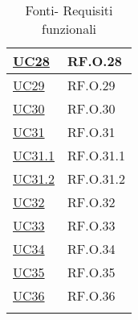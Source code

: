 \begin{longtable}{|P{4,5cm}|>{\arraybackslash}P{9cm}|}
  \hline
  \hyperref[UC28]{UC28} & RF.O.28 \\
  \hline
  \hyperref[UC29]{UC29} & RF.O.29 \\
  \hline
  \hyperref[UC30]{UC30} & RF.O.30 \\
  \hline
  \hyperref[UC31]{UC31} & RF.O.31 \\
  \hline
  \hyperref[UC31point1]{UC31.1} & RF.O.31.1 \\
  \hline
  \hyperref[UC31point2]{UC31.2} & RF.O.31.2 \\
  \hline
  \hyperref[UC32]{UC32} & RF.O.32 \\
  \hline
  \hyperref[UC33]{UC33} & RF.O.33 \\
  \hline
  \hyperref[UC34]{UC34} & RF.O.34 \\
  \hline
  \hyperref[UC35]{UC35} & RF.O.35\\
  \hline
  \hyperref[UC36]{UC36} & RF.O.36 \\
  \hline
\caption{Fonti- Requisiti funzionali}
\end{longtable}

